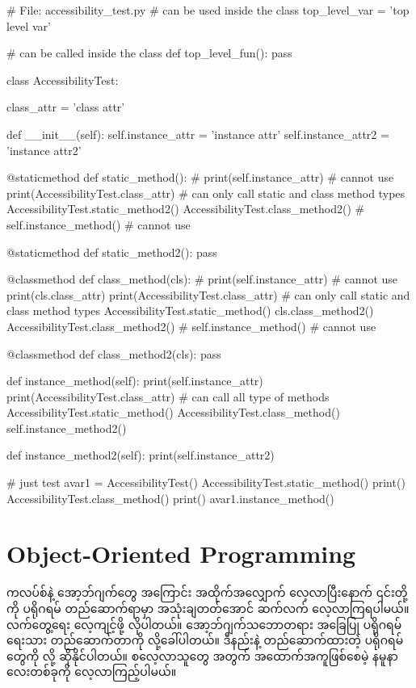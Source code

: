 %
\begin{py}
# File: accessibility_test.py
# can be used inside the class
top_level_var = 'top level var'


# can be called inside the class
def top_level_fun():
    pass


class AccessibilityTest:

    class_attr = 'class attr'

    def __init__(self):
        self.instance_attr = 'instance  attr'
        self.instance_attr2 = 'instance  attr2'

    @staticmethod
    def static_method():
        # print(self.instance_attr)   # cannot use
        print(AccessibilityTest.class_attr)
        # can only call static and class method types
        AccessibilityTest.static_method2()
        AccessibilityTest.class_method2()
        # self.instance_method()      # cannot use

    @staticmethod
    def static_method2():
        pass

    @classmethod
    def class_method(cls):
        # print(self.instance_attr)  # cannot use
        print(cls.class_attr)
        print(AccessibilityTest.class_attr)
        # can only call static and class method types
        AccessibilityTest.static_method()
        cls.class_method2()
        AccessibilityTest.class_method2()
        # self.instance_method()      # cannot use

    @classmethod
    def class_method2(cls):
        pass

    def instance_method(self):
        print(self.instance_attr)
        print(AccessibilityTest.class_attr)
        # can call all type of methods
        AccessibilityTest.static_method()
        AccessibilityTest.class_method()
        self.instance_method2()

    def instance_method2(self):
        print(self.instance_attr2)


# just test
avar1 = AccessibilityTest()
AccessibilityTest.static_method()
print()
AccessibilityTest.class_method()
print()
avar1.instance_method()
\end{py}
%

\section{Object-Oriented Programming}
ကလပ်စ်နဲ့ အော့ဘ်ဂျက်တွေ အကြောင်း အထိုက်အလျှောက် လေ့လာပြီးနောက် ၎င်းတို့ကို ပရိုဂရမ် တည်\allowbreak ဆောက်ရာမှာ အသုံးချတတ်အောင် ဆက်လက် လေ့လာကြရပါမယ်။ လက်တွေ့ရေး လေ့ကျင့်ဖို့ လိုပါတယ်။ အော့ဘ်ဂျက်သဘောတရား အခြေပြု ပရိုဂရမ်ရေးသား တည်ဆောက်တာကို  လို့ခေါ်ပါတယ်။ ဒီနည်းနဲ့ တည်ဆောက်ထားတဲ့ ပရိုဂရမ်တွေကို  လို့ ဆိုနိုင်ပါတယ်။ စလေ့လာသူတွေ အတွက် အထောက်အကူဖြစ်စေမဲ့ နမူနာ  လေးတစ်ခုကို လေ့လာကြည့်ပါမယ်။ 

